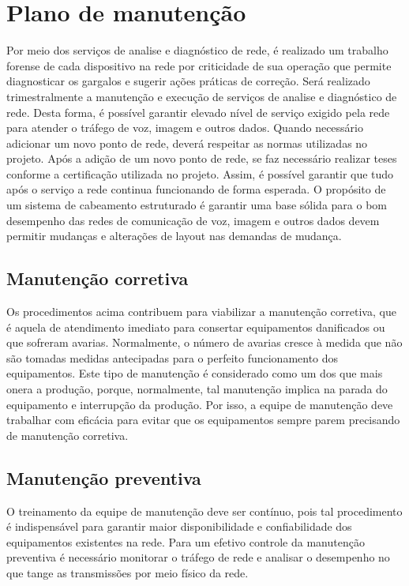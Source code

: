 \documentclass[	DIV=calc,%
							paper=a4,%
							fontsize=12pt,%
							onecolumn]{scrartcl}	 					%
\begin{document}
\section{Plano de manutenção}

Por meio dos serviços de analise e diagnóstico de rede, é realizado um trabalho forense de cada dispositivo na rede por criticidade de sua operação que permite diagnosticar os gargalos e sugerir ações práticas de correção.
Será realizado trimestralmente a manutenção e execução de serviços de analise e diagnóstico de rede. Desta forma, é possível garantir elevado nível de serviço exigido pela rede para atender o tráfego de voz, imagem e outros dados.
Quando necessário adicionar um novo ponto de rede, deverá respeitar as normas utilizadas no projeto. Após a adição de um novo ponto de rede, se faz necessário realizar teses conforme a certificação utilizada no projeto. Assim, é possível garantir que tudo após o serviço a rede continua funcionando de forma esperada.
O propósito de um sistema de cabeamento estruturado é garantir uma base sólida para o bom desempenho das redes de comunicação de voz, imagem e outros dados devem permitir mudanças e alterações de layout nas demandas de mudança.
\subsection{Manutenção corretiva}
Os procedimentos acima contribuem para viabilizar a manutenção corretiva, que é aquela de atendimento imediato para consertar equipamentos danificados ou que sofreram avarias. Normalmente, o número de avarias cresce à medida que não são tomadas medidas antecipadas para o perfeito funcionamento dos equipamentos.
Este tipo de manutenção é considerado como um dos que mais onera a produção, porque, normalmente, tal manutenção implica na parada do equipamento e interrupção da produção. Por isso, a equipe de manutenção deve trabalhar com eficácia para evitar que os equipamentos sempre parem precisando de manutenção corretiva.
\subsection{Manutenção preventiva}
O treinamento da equipe de manutenção deve ser contínuo, pois tal procedimento é indispensável para garantir maior disponibilidade e confiabilidade dos equipamentos existentes na rede. Para um efetivo controle da manutenção preventiva é necessário monitorar o tráfego de rede e analisar o desempenho no que tange as transmissões por meio físico da rede. 
\end{document}
